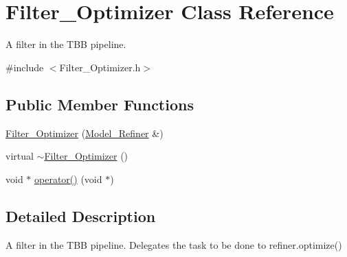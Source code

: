 \hypertarget{class_filter___optimizer}{
\section{Filter\_\-Optimizer Class Reference}
\label{class_filter___optimizer}
}


A filter in the TBB pipeline.  




{\ttfamily \#include $<$Filter\_\-Optimizer.h$>$}

\subsection*{Public Member Functions}
\begin{DoxyCompactItemize}
\item 
\hyperlink{class_filter___optimizer_a9f6909dd505e2ee8c2d7632a1b962113}{Filter\_\-Optimizer} (\hyperlink{class_model___refiner}{Model\_\-Refiner} \&)
\item 
virtual \hyperlink{class_filter___optimizer_a098cadb780d0b2576e62641885d5750e}{$\sim$Filter\_\-Optimizer} ()
\item 
void $\ast$ \hyperlink{class_filter___optimizer_a3f515565820d3486c8671affd6e519ec}{operator()} (void $\ast$)
\end{DoxyCompactItemize}


\subsection{Detailed Description}
A filter in the TBB pipeline. Delegates the task to be done to refiner.optimize() 

